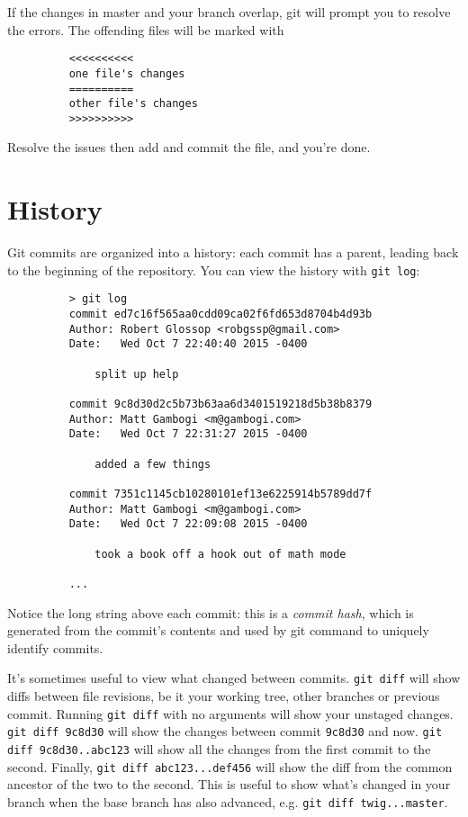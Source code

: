 \documentclass[11pt]{report}
\begin{document}
If the changes in master and your branch overlap, git will prompt you
to resolve the errors. The offending files will be marked with

\begin{figure}[H]
  \begin{lstlisting}
    <<<<<<<<<<
    one file's changes
    ==========
    other file's changes
    >>>>>>>>>>
  \end{lstlisting}
\end{figure}

Resolve the issues then add and commit the file, and you're done.

\section{History}

Git commits are organized into a history: each commit has a parent,
leading back to the beginning of the repository. You can view the
history with \texttt{git log}:

\begin{figure}[H]
  \begin{lstlisting}
    > git log
    commit ed7c16f565aa0cdd09ca02f6fd653d8704b4d93b
    Author: Robert Glossop <robgssp@gmail.com>
    Date:   Wed Oct 7 22:40:40 2015 -0400
    
        split up help
    
    commit 9c8d30d2c5b73b63aa6d3401519218d5b38b8379
    Author: Matt Gambogi <m@gambogi.com>
    Date:   Wed Oct 7 22:31:27 2015 -0400
    
        added a few things
    
    commit 7351c1145cb10280101ef13e6225914b5789dd7f
    Author: Matt Gambogi <m@gambogi.com>
    Date:   Wed Oct 7 22:09:08 2015 -0400
    
        took a book off a hook out of math mode

    ...
  \end{lstlisting}
\end{figure}

Notice the long string above each commit: this is a \emph{commit
  hash}, which is generated from the commit's contents and used by git
command to uniquely identify commits.

It's sometimes useful to view what changed between commits.
\texttt{git diff} will show diffs between file revisions, be it your
working tree, other branches or previous commit. Running \texttt{git
  diff} with no arguments will show your unstaged changes. \texttt{git
  diff 9c8d30} will show the changes between commit \texttt{9c8d30}
and now. \texttt{git diff 9c8d30..abc123} will show all the changes
from the first commit to the second. Finally, \texttt{git diff
  abc123...def456} will show the diff from the common ancestor of the
two to the second. This is useful to show what's changed in your
branch when the base branch has also advanced, e.g. \texttt{git diff
  twig...master}.
\end{document}
